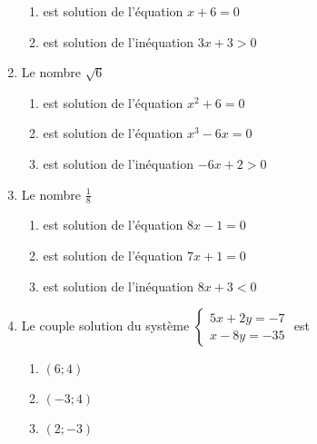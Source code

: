 \documentclass[oneside,twocolumn,landscape]{book}
\begin{document}
\begin{enumerate}
\begin{enumerate}
\item\MauvaiseReponse est solution de l'équation $x+6=0$

\item\BonneReponse est solution de l'inéquation $3x+3>0$

\end{enumerate}



\item Le nombre $\sqrt{6}$

\begin{enumerate}

\item\MauvaiseReponse est solution de l'équation $x^{2}+6=0$

\item\BonneReponse est solution de l'équation $x^{3}-6x=0$

\item\MauvaiseReponse est solution de l'inéquation $-6x+2>0$

\end{enumerate}

\newpage

\item Le nombre $\frac{1}{8}$

\begin{enumerate}

\item\BonneReponse est solution de l'équation $8x-1=0$
\item\MauvaiseReponse est solution de l'équation $7x+1=0$


\item\MauvaiseReponse est solution de l'inéquation $8x+3<0$

\end{enumerate}



\item Le couple solution du système $\left\{\begin{array}{c}5x+2y=-7 \\ x-8y=-35\end{array}\right.$ est

\begin{enumerate}

\item\MauvaiseReponse $(6;4)$

\item\BonneReponse $(-3 ;4)$
\item\MauvaiseReponse $(2 ; -3)$



\end{enumerate}
\end{enumerate}
\end{document}
